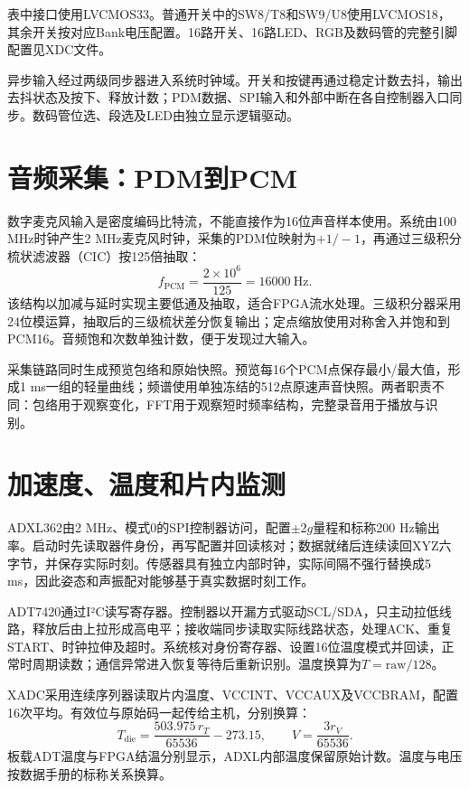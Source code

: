 表中接口使用LVCMOS33。普通开关中的SW8/T8和SW9/U8使用LVCMOS18，其余开关按对应Bank电压配置。16路开关、16路LED、RGB及数码管的完整引脚配置见XDC文件。

异步输入经过两级同步器进入系统时钟域。开关和按键再通过稳定计数去抖，输出去抖状态及按下、释放计数；PDM数据、SPI输入和外部中断在各自控制器入口同步。数码管位选、段选及LED由独立显示逻辑驱动。

\section{音频采集：PDM到PCM}
数字麦克风输入是密度编码比特流，不能直接作为16位声音样本使用。系统由100 MHz时钟产生2 MHz麦克风时钟，采集的PDM位映射为$+1/-1$，再通过三级积分梳状滤波器（CIC）按125倍抽取：
\begin{equation}
 f_\mathrm{PCM}=\frac{2\times10^6}{125}=16000\ \mathrm{Hz}.
\end{equation}
该结构以加减与延时实现主要低通及抽取，适合FPGA流水处理。三级积分器采用24位模运算，抽取后的三级梳状差分恢复输出；定点缩放使用对称舍入并饱和到 PCM16。音频饱和次数单独计数，便于发现过大输入。


采集链路同时生成预览包络和原始快照。预览每16个PCM点保存最小/最大值，形成1 ms一组的轻量曲线；频谱使用单独冻结的512点原速声音快照。两者职责不同：包络用于观察变化，FFT用于观察短时频率结构，完整录音用于播放与识别。

\section{加速度、温度和片内监测}
ADXL362由2 MHz、模式0的SPI控制器访问，配置$\pm2g$量程和标称200 Hz输出率\cite{adxl}。启动时先读取器件身份，再写配置并回读核对；数据就绪后连续读回XYZ六字节，并保存实际时刻。传感器具有独立内部时钟，实际间隔不强行替换成5 ms，因此姿态和声振配对能够基于真实数据时刻工作。

ADT7420通过I²C读写寄存器。控制器以开漏方式驱动SCL/SDA，只主动拉低线路，释放后由上拉形成高电平；接收端同步读取实际线路状态，处理ACK、重复START、时钟拉伸及超时。系统核对身份寄存器、设置16位温度模式并回读，正常时周期读数；通信异常进入恢复等待后重新识别\cite{adt}。温度换算为$T=\mathrm{raw}/128$。

XADC采用连续序列器读取片内温度、VCCINT、VCCAUX及VCCBRAM，配置16次平均\cite{xadc}。有效位与原始码一起传给主机，分别换算：
\begin{equation}
 T_\mathrm{die}=\frac{503.975\,r_T}{65536}-273.15,\qquad
 V=\frac{3r_V}{65536}.
\end{equation}
板载ADT温度与FPGA结温分别显示，ADXL内部温度保留原始计数。温度与电压按数据手册的标称关系换算。


